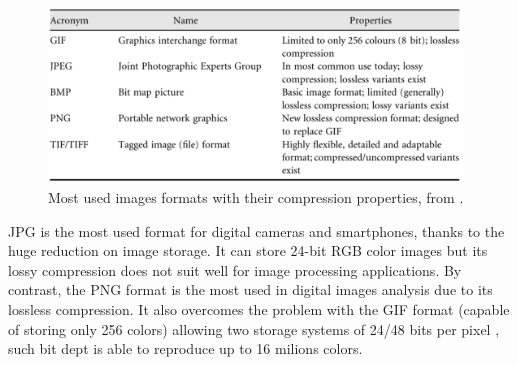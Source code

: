 \documentclass[../main.tex]{subfiles}
\begin{document}
\begin{figure}[H] 
\begin{center}
\includegraphics[width=11cm]{images/image_formats.png}
\caption{\small{Most used images formats with their compression properties, from \cite{digital_processing_matlab}.}}\label{fig:table_formats}
\end{center}
\end{figure}
JPG is the most used format for digital cameras and smartphones, thanks to the huge reduction on image storage. It can store 24-bit RGB color images but its lossy compression does not suit well for image processing applications. By contrast, the PNG format is the most used in digital images analysis due to its lossless compression. It  also overcomes the problem with the GIF format (capable of storing only 256 colors) allowing two storage systems of 24/48 bits per pixel \cite{roelofs1999png}, such bit dept is able to reproduce up to 16 milions colors.

 
\end{document}
